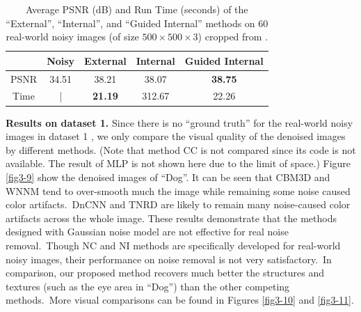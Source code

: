 \begin{table}[t!]
\caption{Average PSNR (dB) and Run Time (seconds) of the ``External'', ``Internal'', and ``Guided Internal'' methods on 60 real-world noisy images (of size $500\times500\times3$) cropped from \cite{crosschannel2016}.}
\label{tab3-1}
\begin{center}
\renewcommand\arraystretch{1}
\begin{tabular}{|c||c|c|c|c|}
\hline
 & \small\textbf{Noisy} &\small \textbf{External} & \small\textbf{Internal} & \small\textbf{Guided Internal}  
\\
\hline
PSNR & 34.51 & 38.21 & 38.07 & \textbf{38.75} 
\\
\hline
Time & | &  \textbf{21.19}  & 312.67 & 22.26
\\
\hline
\end{tabular}
\end{center}
\vspace{-3mm}
\end{table}

\textbf{Results on dataset 1.}
Since there is no ``ground truth'' for the real-world noisy images in  dataset 1 \cite{ncwebsite}, we only compare the visual quality of the denoised images by different methods. (Note that method CC \cite{crosschannel2016} is not compared since its code is not available. The result of MLP is not shown here due to the limit of space.) Figure \ref{fig3-9} show the denoised images of ``Dog''. It can be seen that CBM3D and WNNM tend to over-smooth much the image while remaining some noise caused color artifacts.\ DnCNN and TNRD are likely to remain many noise-caused color artifacts across the whole image. These results demonstrate that the methods designed with Gaussian noise model are not effective for real noise removal.\ Though NC and NI methods are specifically developed for real-world noisy images, their performance on noise removal is not very satisfactory.\ In comparison, our proposed method recovers much better the structures and textures (such as the eye area in ``Dog'') than the other competing methods.\ More visual comparisons can be found in Figures \ref{fig3-10} and \ref{fig3-11}.


